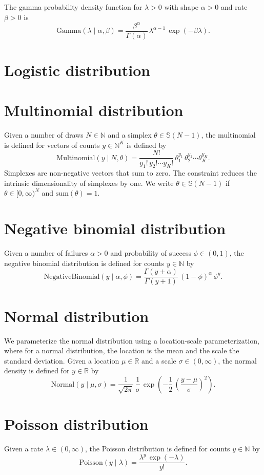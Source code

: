 \documentclass[11pt]{report}
\begin{document}
The gamma probability density function for $\lambda > 0$
with shape $\alpha > 0$ and rate $\beta > 0$ is
\[
  \textrm{Gamma}(\lambda \mid \alpha, \beta)
  = \frac{\beta^{\alpha}}{\Gamma(\alpha)}
  \, \lambda^{\alpha - 1}
  \, \exp(-\beta \lambda).
\]


\section{Logistic distribution}

\section{Multinomial distribution}

Given a number of draws $N \in \mathbb{N}$ and a simplex
$\theta \in \mathbb{S}(N-1)$, the multinomial is defined for vectors
of counts $y \in \mathbb{N}^K$ is defined by
%
\[
  \textrm{Multinomial}(y \mid N, \theta)
  = \frac{N!}{y_1! \, y_2! \cdots y_K!} \, \theta_1^{y_1} \, \theta_2^{y_2} \cdots \theta_K^{y_K}.
\]
Simplexes are non-negative vectors that sum to zero.  The constraint
reduces the intrinsic dimensionality of simplexes by one.  We
write
$\theta \in \mathbb{S}(N - 1)$ if $\theta \in [0, \infty)^N$
and $\textrm{sum}(\theta) = 1$.

\section{Negative binomial distribution}

Given a number of failures $\alpha > 0$ and probability of success
$\phi \in (0, 1)$, the negative binomial distribution is defined for
counts $y \in \mathbb{N}$ by
\[
  \textrm{NegativeBinomial}(y \mid \alpha, \phi)
  = \frac{\Gamma(y + \alpha)}{\Gamma(y + 1)}
  \, (1 - \phi)^\alpha
  \, \phi^y.
\]


\section{Normal distribution}

We parameterize the normal distribution using a location-scale
parameterization, where for a normal distribution, the location is the
mean and the scale the standard deviation.  Given a location $\mu \in
\mathbb{R}$ and a scale $\sigma \in (0, \infty)$, the normal density
is defined for $y \in \mathbb{R}$ by
\[
  \textrm{Normal}(y \mid \mu, \sigma)
  = \frac{1}{\sqrt{2\pi}}
  \, \frac{1}{\sigma}
  \, \exp\!\left( -\frac{1}{2} \, \left( \frac{y - \mu}{\sigma}
                                  \right)^2
           \right).
\]

\section{Poisson distribution}

Given a rate $\lambda \in (0, \infty)$, the Poisson distribution is
defined for counts $y \in \mathbb{N}$ by
\[
  \textrm{Poisson}(y \mid \lambda)
  = \frac{\lambda^y \, \exp(-\lambda)}{y!}.
\]
\end{document}
